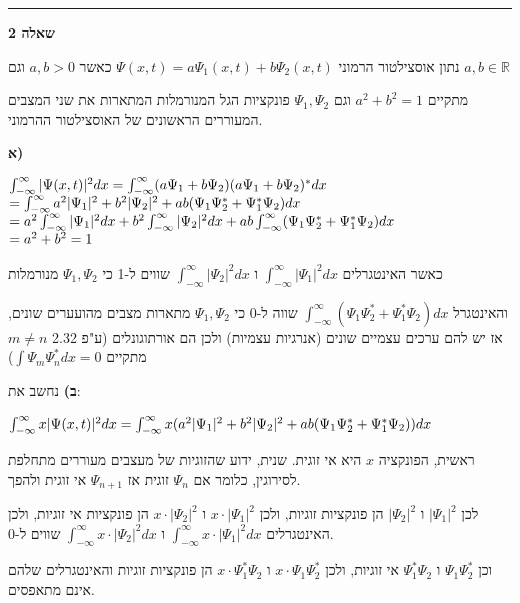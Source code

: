 \documentclass[14pt]{extarticle}
\makeatletter
\newenvironment{lefteqs}{%
    \begin{english}%
    \begin{flushleft}%
    \renewcommand{\arraystretch}{1.3}%
    $\begin{array}{@{}l@{}}%
}{%
    \end{array}$%
    \end{flushleft}%
    \end{english}%
}
\makeatother
\begin{document}
\vspace{3em}
\hrule
\vspace{2em}

\textbf{\large שאלה 2}

נתון אוסצילטור הרמוני $\Psi(x,t) = a\Psi_1(x,t) + b\Psi_2(x,t)$
כאשר $a,b>0$ וגם $a,b \in \mathbb{R}$

מתקיים $a^2+b^2=1$ וגם $\Psi_1, \Psi_2$ פונקציות הגל המנורמלות המתארות את שני המצבים המעוררים הראשונים של האוסצילטור ההרמוני.

\textbf{א)}
\begin{lefteqs}
    \int_{-\infty}^{\infty} |\Psi(x,t)|^2 dx = \int_{-\infty}^{\infty} (a\Psi_1 + b\Psi_2)(a\Psi_1 + b\Psi_2)^{*} dx \\
    = \int_{-\infty}^{\infty} a^2 |\Psi_1|^2 + b^2 |\Psi_2|^2 + ab(\Psi_1 \Psi_2^{*} + \Psi_1^{*} \Psi_2) dx \\
    = a^2\int_{-\infty}^{\infty} |\Psi_1|^2 dx + b^2 \int_{-\infty}^{\infty} |\Psi_2|^2 dx + ab \int_{-\infty}^{\infty} (\Psi_1 \Psi_2^{*} + \Psi_1^{*} \Psi_2) dx \\
    = a^2 + b^2 = 1
\end{lefteqs}

כאשר האינטגרלים $\int_{-\infty}^{\infty} |\Psi_1|^2 dx$ ו $\int_{-\infty}^{\infty} |\Psi_2|^2 dx$ שווים ל-1 כי $\Psi_1, \Psi_2$ מנורמלות

והאינטגרל $\int_{-\infty}^{\infty} (\Psi_1 \Psi_2^{*} + \Psi_1^{*} \Psi_2) dx$ שווה ל-0 כי $\Psi_1, \Psi_2$ מתארות מצבים מהועערים שונים, אז יש להם ערכים עצמיים שונים (אנרגיות עצמיות) ולכן הם אורתוגונלים
(ע"פ 2.32 $m\neq n$ מתקיים $\int \Psi_m \Psi_n^{*} dx = 0$)

\textbf{ב)}
נחשב את:
\begin{lefteqs}
    \int_{-\infty}^{\infty} x |\Psi(x,t)|^2 dx = \int_{-\infty}^{\infty} x (a^2 |\Psi_1|^2 + b^2 |\Psi_2|^2 + ab(\Psi_1 \Psi_2^{*} + \Psi_1^{*} \Psi_2)) dx \\
\end{lefteqs}
ראשית, הפונקציה $x$ היא אי זוגית. שנית, ידוע שהזוגיות של מעצבים מעוררים מתחלפת לסירוגין, כלומר אם $\Psi_n$ זוגית אז $\Psi_{n+1}$ אי זוגית ולהפך.

לכן $|\Psi_1|^2$ ו $|\Psi_2|^2$ הן פונקציות זוגיות, ולכן $x \cdot |\Psi_1|^2$ ו $x \cdot |\Psi_2|^2$ הן פונקציות אי זוגיות, ולכן האינטגרלים $\int_{-\infty}^{\infty} x \cdot |\Psi_1|^2 dx$ ו $\int_{-\infty}^{\infty} x \cdot |\Psi_2|^2 dx$ שווים ל-0.

וכן $\Psi_1 \Psi_2^{*}$ ו $\Psi_1^{*} \Psi_2$ אי זוגיות, ולכן $x \cdot \Psi_1 \Psi_2^{*}$ ו $x \cdot \Psi_1^{*} \Psi_2$ הן פונקציות זוגיות והאינטגרלים שלהם אינם מתאפסים.
\end{document}
